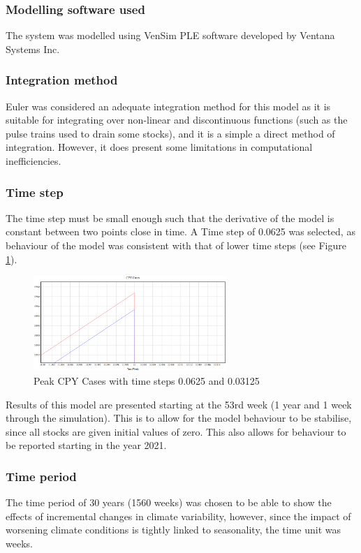 \subsubsection{Modelling software used}
The system was modelled using VenSim PLE software developed by Ventana Systems Inc.
    
\subsubsection{Integration method}
Euler was considered an adequate integration method for this model as it is suitable for integrating over non-linear and discontinuous functions (such as the pulse trains used to drain some stocks), and it is a simple a direct method of integration. However, it does present some limitations in computational inefficiencies.

\subsubsection{Time step}
The time step must be small enough such that the derivative of the model is constant between two points close in time. A Time step of 0.0625 was selected, as behaviour of the model was consistent with that of lower time steps (see Figure \ref{fig:cpy cases with time step}).

\begin{figure}[h!]
\centering
\includegraphics[width=0.65\textwidth]{images/timestep.PNG}
\caption{Peak CPY Cases with time steps 0.0625 and 0.03125}
\label{fig:cpy cases with time step}
\end{figure}

Results of this model are presented starting at the 53rd week (1 year and 1 week through the simulation). This is to allow for the model behaviour to be stabilise, since all stocks are given initial values of zero. This also allows for behaviour to be reported starting in the year 2021.

\subsubsection{Time period}
The time period of 30 years (1560 weeks) was chosen to be able to show the effects of incremental changes in climate variability, however, since the impact of worsening climate conditions is tightly linked to seasonality, the time unit was weeks. %

